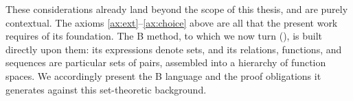 These considerations already land beyond the scope of this thesis, and are purely contextual.
The axioms \eqref{ax:ext}--\eqref{ax:choice} above are all that the present work requires of its foundation.
The B method, to which we now turn (), is built directly upon them:
its expressions denote sets, and its relations, functions, and sequences are
particular sets of pairs, assembled into a hierarchy of function spaces. We accordingly present the B
language and the proof obligations it generates against this set-theoretic
background.
